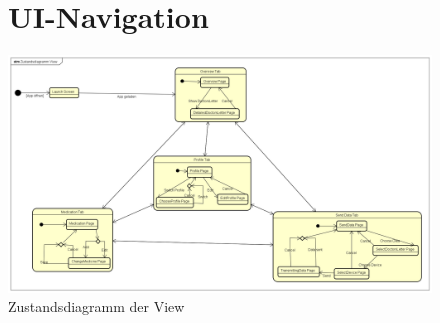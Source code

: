 \documentclass[a4paper]{scrreprt}
\begin{document}
\newpage
\begin{figure}
\section{UI-Navigation}
\centering
\includegraphics[width=0.9\textheight, angle=90]{graphics/Zustandsdiagramm_View}
\caption{Zustandsdiagramm der View}
\end{figure}
\end{document}
